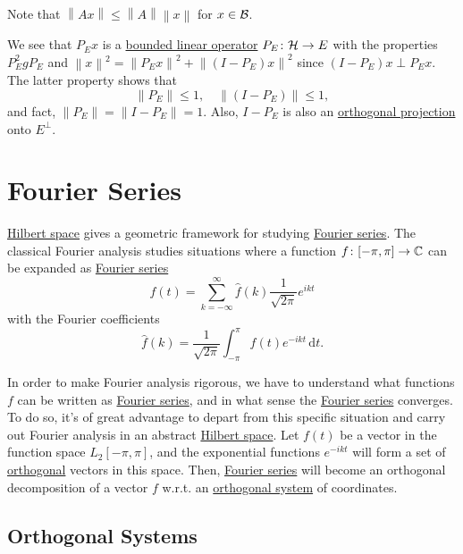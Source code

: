 \begin{remark}
	Note that \(\left\lVert Ax\right\rVert \leq \left\lVert A\right\rVert \left\lVert x\right\rVert \) for \(x\in \mathcal{\MakeUppercase{b}} \).
\end{remark}

We see that \(P_E x\) is a \hyperref[def:bounded-linear-map]{bounded linear operator} \(P_E\colon \mathcal{\MakeUppercase{h}} \to E\) with the properties \(P^{2} _E g P_E\) and \(\left\lVert x\right\rVert ^{2} = \left\lVert P_E x\right\rVert ^{2} + \left\lVert (I - P_E)x\right\rVert ^{2} \) since \((I - P_E)x\perp P_E x\). The latter property shows that
\[
	\left\lVert P_E\right\rVert \leq 1,\quad \left\lVert (I - P_E)\right\rVert \leq 1,
\]
and fact, \(\left\lVert P_E\right\rVert = \left\lVert I-P_E\right\rVert = 1\). Also, \(I - P_E\) is also an \hyperref[def:orthogonal-projection]{orthogonal projection} onto \(E^\perp\).

\section{Fourier Series}
\hyperref[def:Hilbert-space]{Hilbert space} gives a geometric framework for studying \hyperref[def:Fourier-series]{Fourier series}. The classical Fourier analysis studies situations where a function \(f\colon [-\pi , \pi ]\to \mathbb{\MakeUppercase{c}} \) can be expanded as \hyperref[def:Fourier-series]{Fourier series}
\[
	f(t) = \sum_{k=-\infty }^{\infty} \hat{f} (k) \frac{1}{\sqrt{2\pi } }e^{ikt}
\]
with the Fourier coefficients
\[
	\hat{f} (k) = \frac{1}{\sqrt{2\pi } }\int _{-\pi}^\pi f(t) e^{-ikt}\,\mathrm{d} t.
\]

In order to make Fourier analysis rigorous, we have to understand what functions \(f\) can be written as \hyperref[def:Fourier-series]{Fourier series}, and in what sense the \hyperref[def:Fourier-series]{Fourier series} converges. To do so, it's of great advantage to depart from this specific situation and carry out Fourier analysis in an abstract \hyperref[def:Hilbert-space]{Hilbert space}. Let \(f(t)\) be a vector in the function space \(L_2[-\pi , \pi ]\), and the exponential functions \(e^{-ikt}\) will form a set of \hyperref[def:orthogonal]{orthogonal} vectors in this space. Then, \hyperref[def:Fourier-series]{Fourier series} will become an orthogonal decomposition of a vector \(f\) w.r.t. an \hyperref[def:orthogonal-system]{orthogonal system} of coordinates.

\subsection{Orthogonal Systems}

